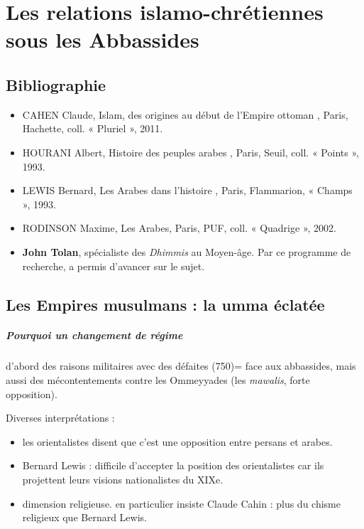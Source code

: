 \chapter{Les relations islamo-chrétiennes sous les Abbassides}

\section{Bibliographie}

\begin{itemize}
    \item 
CAHEN Claude,
Islam, des origines au début de l’Empire ottoman , Paris,
Hachette, coll. « Pluriel », 2011.
    \item 
HOURANI Albert,
Histoire des peuples arabes , Paris, Seuil, coll. « Points »,
1993.
    \item 
LEWIS Bernard,
Les Arabes dans l’histoire , Paris, Flammarion, « Champs »,
1993.
    \item 
RODINSON Maxime,
Les Arabes, Paris, PUF, coll. « Quadrige », 2002.
 
    \item \textbf{John Tolan}, spécialiste des \textit{Dhimmis} au Moyen-âge.
Par ce programme de recherche, a permis d'avancer sur le sujet.
\end{itemize}


\section{Les Empires musulmans : la umma éclatée}


\paragraph{Pourquoi un changement de régime} d'abord des raisons militaires avec des défaites (750)= face aux abbassides, mais aussi des mécontentements contre les Ommeyyades (les \textit{mawalis}, forte opposition). 

Diverses interprétations : 
\begin{itemize}
\item les orientalistes disent que c'est une opposition entre persans et arabes.
    \item Bernard Lewis : difficile d'accepter la position des orientalistes car ils projettent leurs visions nationalistes du XIXe.
    \item dimension religieuse. en particulier insiste Claude Cahin : plus du chisme religieux que Bernard Lewis. 
\end{itemize}

